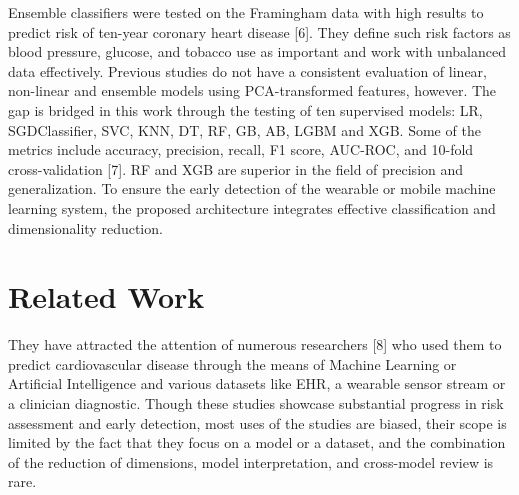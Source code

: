 \documentclass[conference]{IEEEtran}
\begin{document}
\vspace{1em}

Ensemble classifiers were tested on the Framingham data with high results to predict risk of ten-year coronary heart disease [6]. They define such risk factors as blood pressure, glucose, and tobacco use as important and work with unbalanced data effectively. Previous studies do not have a consistent evaluation of linear, non-linear and ensemble models using PCA-transformed features, however. The gap is bridged in this work through the testing of ten supervised models: LR, SGDClassifier, SVC, KNN, DT, RF, GB, AB, LGBM and XGB. Some of the metrics include accuracy, precision, recall, F1 score, AUC-ROC, and 10-fold cross-validation [7]. RF and XGB are superior in the field of precision and generalization. To ensure the early detection of the wearable or mobile machine learning system, the proposed architecture integrates effective classification and dimensionality reduction.
 


\section{Related Work}
They have attracted the attention of numerous researchers [8] who used them to predict cardiovascular disease through the means of Machine Learning or Artificial Intelligence and various datasets like EHR, a wearable sensor stream or a clinician diagnostic. Though these studies showcase substantial progress in risk assessment and early detection, most uses of the studies are biased, their scope is limited by the fact that they focus on a model or a dataset, and the combination of the reduction of dimensions, model interpretation, and cross-model review is rare.

\vspace{1em}
\end{document}
